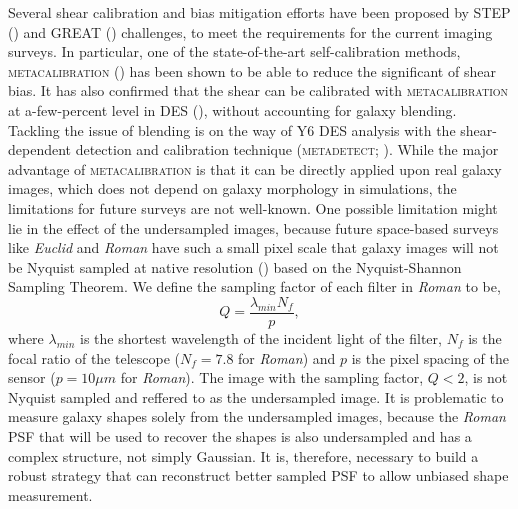 \documentclass[fleqn,usenatbib]{mnras}
\begin{document}
Several shear calibration and bias mitigation efforts have been proposed by STEP (\citealt{2006MNRAS.368.1323H, 2007MNRAS.376...13M}) and GREAT (\citealt{2010MNRAS.405.2044B, 2013ApJS..205...12K, 2015MNRAS.450.2963M}) challenges, to meet the requirements for the current imaging surveys. In particular, one of the state-of-the-art self-calibration methods, \textsc{metacalibration} (\citealt{2017arXiv170202600H, 2017ApJ...841...24S}) has been shown to be able to reduce the significant of shear bias. It has also confirmed that the shear can be calibrated with \textsc{metacalibration} at a-few-percent level in DES (\citealt{2018MNRAS.481.1149Z, 2020arXiv201103408G}), without accounting for galaxy blending. Tackling the issue of blending is on the way of Y6 DES analysis with the shear-dependent detection and calibration technique (\textsc{metadetect}; \citealt{2020ApJ...902..138S}). While the major advantage of \textsc{metacalibration} is that it can be directly applied upon real galaxy images, which does not depend on galaxy morphology in simulations, the limitations for future surveys are not well-known. One possible limitation might lie in the effect of the undersampled images, because future space-based surveys like \emph{Euclid} and \emph{Roman} have such a small pixel scale that galaxy images will not be Nyquist sampled at native resolution (\citealt{2013PASP..125.1496S}) based on the Nyquist-Shannon Sampling Theorem. We define the sampling factor of each filter in \emph{Roman} to be, 
\begin{equation}
    Q = \frac{\lambda_{min}N_{f}}{p}, 
    \label{eqn:sampling}
\end{equation}
where $\lambda_{min}$ is the shortest wavelength of the incident light of the filter, $N_{f}$ is the focal ratio of the telescope ($N_{f}=7.8$ for \emph{Roman}) and $p$ is the pixel spacing of the sensor ($p=10\mu m$ for \emph{Roman}). The image with the sampling factor, $Q < 2$, is not Nyquist sampled and reffered to as the undersampled image. It is problematic to measure galaxy shapes solely from the undersampled images, because the \emph{Roman} PSF that will be used to recover the shapes is also undersampled and has a complex structure, not simply Gaussian. It is, therefore, necessary to build a robust strategy that can reconstruct better sampled PSF to allow unbiased shape measurement. 
\end{document}
